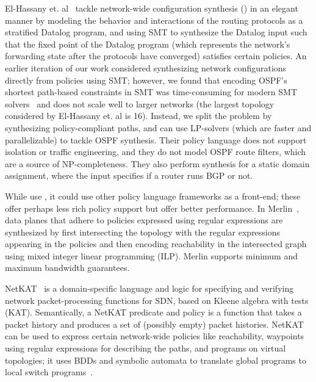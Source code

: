 El-Hassany et. al~\cite{synet} tackle network-wide configuration
synthesis () in an elegant manner by
modeling the behavior and interactions of the routing protocols as a
stratified Datalog program, and using SMT to synthesize the Datalog
input such that the fixed point of the Datalog program (which
represents the network's forwarding state after the protocols have
converged) satisfies certain policies.  An earlier iteration of our
work considered synthesizing network configurations directly from
policies using SMT; however, we found that encoding OSPF's shortest
path-based constraints in SMT was time-consuming for modern SMT
solvers~\cite{z3} and does not scale well to larger networks (the
largest topology considered by El-Hassany et. al is 16). Instead, we
split the problem by synthesizing policy-compliant paths, and can use
LP-solvers (which are faster and parallelizable) to tackle OSPF
synthesis.  Their policy language does not support isolation or
traffic engineering, and they do not model OSPF route filters, which
are a source of NP-completeness.  They also perform synthesis for a
static domain assignment, where the input specifies if a router runs
BGP or not.

 While \name use \genesis, it could use
other policy language frameworks as a front-end; these offer perhaps
less rich policy support but offer better performance. %
In Merlin~\cite{merlin}, data planes that adhere to policies expressed
using regular expressions are synthesized by first intersecting the
topology with the regular expressions appearing in the policies and
then encoding reachability in the intersected graph using mixed
integer linear programming (ILP).  Merlin supports minimum and maximum
bandwidth guarantees.

NetKAT~\cite{netkat} is a domain-specific language and logic for 
specifying and verifying network packet-processing functions
for SDN, based on Kleene algebra with tests (KAT). Semantically,
a NetKAT predicate and policy is a function that takes a packet
history and produces a set of (possibly empty) packet histories. 
NetKAT can be used to express certain network-wide policies like 
reachability, waypoints using regular expressions for describing the paths, 
and programs on virtual topologies; it uses
BDDs and symbolic automata to translate global programs to local
switch programs~\cite{netkatcompiler}.

